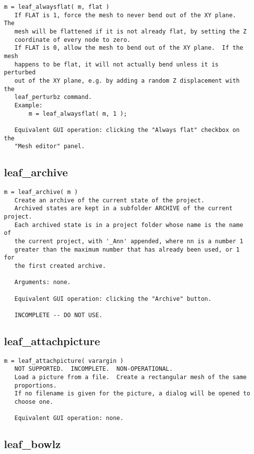 \begin{verbatim}
m = leaf_alwaysflat( m, flat )
   If FLAT is 1, force the mesh to never bend out of the XY plane.  The
   mesh will be flattened if it is not already flat, by setting the Z
   coordinate of every node to zero.
   If FLAT is 0, allow the mesh to bend out of the XY plane.  If the mesh
   happens to be flat, it will not actually bend unless it is perturbed
   out of the XY plane, e.g. by adding a random Z displacement with the
   leaf_perturbz command.
   Example:
       m = leaf_alwaysflat( m, 1 );

   Equivalent GUI operation: clicking the "Always flat" checkbox on the
   "Mesh editor" panel.
\end{verbatim}

\subsection{leaf\_archive}\label{section-leaf-archive}

\begin{verbatim}
m = leaf_archive( m )
   Create an archive of the current state of the project.
   Archived states are kept in a subfolder ARCHIVE of the current project.
   Each archived state is in a project folder whose name is the name of
   the current project, with '_Ann' appended, where nn is a number 1
   greater than the maximum number that has already been used, or 1 for
   the first created archive.

   Arguments: none.

   Equivalent GUI operation: clicking the "Archive" button.

   INCOMPLETE -- DO NOT USE.
\end{verbatim}

\subsection{leaf\_attachpicture}\label{section-leaf-attachpicture}

\begin{verbatim}
m = leaf_attachpicture( varargin )
   NOT SUPPORTED.  INCOMPLETE.  NON-OPERATIONAL.
   Load a picture from a file.  Create a rectangular mesh of the same
   proportions.
   If no filename is given for the picture, a dialog will be opened to
   choose one.

   Equivalent GUI operation: none.
\end{verbatim}

\subsection{leaf\_bowlz}\label{section-leaf-bowlz}

